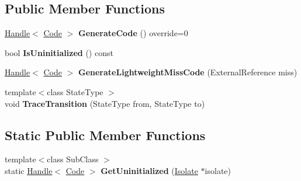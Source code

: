 \subsection*{Public Member Functions}
\begin{DoxyCompactItemize}
\item 
\hyperlink{classv8_1_1internal_1_1_handle}{Handle}$<$ \hyperlink{classv8_1_1internal_1_1_code}{Code} $>$ {\bfseries Generate\+Code} () override=0\hypertarget{classv8_1_1internal_1_1_hydrogen_code_stub_aaf95b486de1171219a5d287bfdbea7bf}{}\label{classv8_1_1internal_1_1_hydrogen_code_stub_aaf95b486de1171219a5d287bfdbea7bf}

\item 
bool {\bfseries Is\+Uninitialized} () const \hypertarget{classv8_1_1internal_1_1_hydrogen_code_stub_ae1d469b97d9b051d70e5f93983e3ef87}{}\label{classv8_1_1internal_1_1_hydrogen_code_stub_ae1d469b97d9b051d70e5f93983e3ef87}

\item 
\hyperlink{classv8_1_1internal_1_1_handle}{Handle}$<$ \hyperlink{classv8_1_1internal_1_1_code}{Code} $>$ {\bfseries Generate\+Lightweight\+Miss\+Code} (External\+Reference miss)\hypertarget{classv8_1_1internal_1_1_hydrogen_code_stub_ab88874a1d36c6257f9d0fcb2c5c52b0d}{}\label{classv8_1_1internal_1_1_hydrogen_code_stub_ab88874a1d36c6257f9d0fcb2c5c52b0d}

\item 
{\footnotesize template$<$class State\+Type $>$ }\\void {\bfseries Trace\+Transition} (State\+Type from, State\+Type to)\hypertarget{classv8_1_1internal_1_1_hydrogen_code_stub_a3199a1593f7b097e096f2385b78b880e}{}\label{classv8_1_1internal_1_1_hydrogen_code_stub_a3199a1593f7b097e096f2385b78b880e}

\end{DoxyCompactItemize}
\subsection*{Static Public Member Functions}
\begin{DoxyCompactItemize}
\item 
{\footnotesize template$<$class Sub\+Class $>$ }\\static \hyperlink{classv8_1_1internal_1_1_handle}{Handle}$<$ \hyperlink{classv8_1_1internal_1_1_code}{Code} $>$ {\bfseries Get\+Uninitialized} (\hyperlink{classv8_1_1internal_1_1_isolate}{Isolate} $\ast$isolate)\hypertarget{classv8_1_1internal_1_1_hydrogen_code_stub_a03b41c5319d52cdac110d71007ee7c30}{}\label{classv8_1_1internal_1_1_hydrogen_code_stub_a03b41c5319d52cdac110d71007ee7c30}

\end{DoxyCompactItemize}
